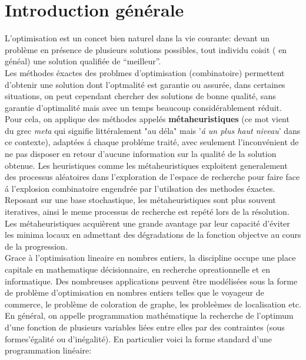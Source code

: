 \documentclass[a4paper,11pt,oneside]{report}
\theoremstyle{plain}
\newcommand{\0}{/ \! \! \! 0}
\theoremstyle{plain}
\begin{document}
\tableofcontents



\chapter*{Introduction g\'en\'erale}

L'optimisation est un concet bien naturel dans la vie courante: devant un probl\`eme en pr\'esence de plusieurs solutions possibles, tout individu
coisit ( en g\'en\'eal) une solution qualifi\'ee de ``meilleur''.\\
Les m\'ethodes \'exactes des problmes d'optimisation (combinatoire) permettent d'obtenir une solution dont l'optmalit\'e est garantie ou assur\'ee, 
dans certaines situations, on peut cependant chercher des solutions de bonne qualit\'e, sans garantie d'optimalit\'e mais avec un temps beaucoup 
consid\'erablement r\'eduit. Pour cela, on applique des m\'ethodes appel\'es  {\bf m\'etaheuristiques}  (ce mot vient du grec {\it meta} qui signifie 
litt\'eralement "au d\'ela" mais '{\it \'a un plus haut niveau}' dans ce contexte), adapt\'ees \'a chaque probl\'eme trait\'e, avec seulement
l'inconv\'enient de ne 
pas disposer en retour d'aucune information sur la qualit\'e de la solution obtenue. Les heuristiques comme les m\'etaheuristiques exploitent
generalement des
 processus al\'eatoires dans l'exploration de l'espace de recherche pour faire face \'a l'explosion combinatoire engendr\'ee par l'utilsation des methodes \'exactes. 
 Reposant sur une base stochastique, les m\'etaheuristiques sont plus souvent iteratives, ainsi le meme processus de recherche est rep\'et\'e lors de la r\'esolution.
 Les m\'etaheuristiques acqui\`erent une grande avantage par leur capacit\'e d'\'eviter les minima locaux en admettant des d\'egradations de la fonction objectve au
 cours de la progression.\\
 Grace \`a l'optimisation lineaire en nombres entiers, la discipline occupe une place capitale en mathematique d\'ecisionnaire, en recherche opreationnelle et en informatique.
 Des nombreuses applications peuvent \^etre mod\'elis\'ees sous la forme de probl\`eme d'optimisation en nombres entiers telles que le voyageur de commerce, le probl\`eme
 de coloration de graphe, les proble\`emes de localisation etc.
 En g\'en\'eral, on appelle programmation math\'ematique la recherche de l'optimum d'une fonction de plusieurs variables li\'ees entre elles
  par des contraintes (sous formes'\'egalit\'e ou d'in\'egalit\'e). En particulier voici la forme standard d'une programmation lin\'eaire:
\end{document}
